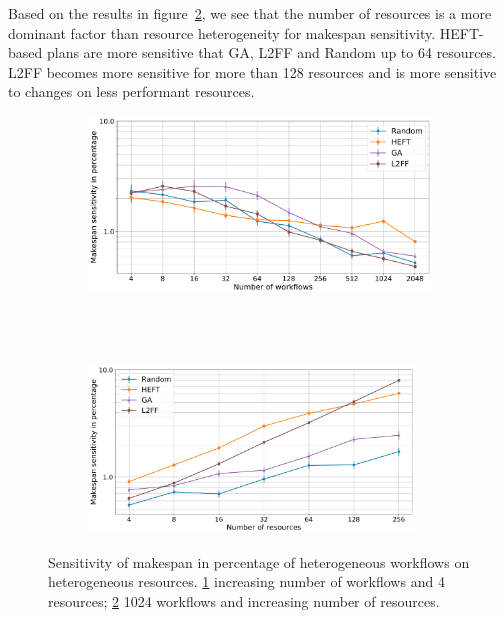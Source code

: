 Based on the results in
figure~\ref{fig:DyHeteroResources_StHeteroCampaignsSens}, we see that the
number of resources is a more dominant factor than resource heterogeneity for
makespan sensitivity. HEFT-based plans are more sensitive that GA, L2FF and
Random up to 64 resources. L2FF becomes more sensitive for more than 128
resources and is more sensitive to changes on less performant resources.

\begin{figure}[ht!]
    \centering
    \begin{subfigure}[b]{0.85\textwidth}
        \includegraphics[width=.95\textwidth]{figures/campaign/StHeteroCampaigns_4DynHeteroResourcesSens.pdf}
        \caption{}
        \label{fig:StHeteroCampaigns_4DyHeteroResourcesSens}
    \end{subfigure}\\
    ~
    \begin{subfigure}[b]{0.85\textwidth}
        \includegraphics[width=0.95\textwidth]{figures/campaign/DynHeteroResources_StHeteroCampaignsSens.pdf}
        \caption{}
        \label{fig:DyHeteroResources_StHeteroCampaignsSens}
    \end{subfigure}
    \caption{Sensitivity of makespan in percentage of heterogeneous workflows on
    heterogeneous resources. \ref{fig:StHeteroCampaigns_4DyHeteroResourcesSens}
    increasing number of workflows and 4 resources;
    \ref{fig:DyHeteroResources_StHeteroCampaignsSens} 1024 workflows and
    increasing number of resources.}
    \label{fig:dyn_hetero_sens_analysis}
\end{figure}

